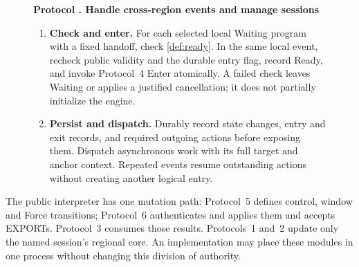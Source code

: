 \documentclass[11pt,a4paper]{article}
\newcounter{protocol}
\newenvironment{protocol}[3][htbp]{\begin{figure}[#1]\refstepcounter{protocol}\label{#2}
\begin{mdframed}[linewidth=.6pt,skipabove=0pt,skipbelow=0pt,
innertopmargin=7pt,innerbottommargin=7pt]\small
\textbf{Protocol \theprotocol. #3}\par\smallskip}{\end{mdframed}\end{figure}}
\begin{document}
\begin{protocol}[H]{alg:rotation}{Handle cross-region events and manage sessions}
\begin{enumerate}[label=\textbf{\arabic*)},itemsep=3pt]
source engines under the original Completion rule.
\item \textbf{Check and enter.} For each selected local Waiting
program with a fixed handoff, check \cref{def:ready}. In the same local
event, recheck public validity and the durable entry flag, record Ready,
and invoke Protocol~4 Enter atomically. A failed check leaves Waiting
or applies a justified cancellation; it does not partially initialize
the engine.
\item \textbf{Persist and dispatch.} Durably record state changes,
entry and exit records, and required outgoing actions before exposing
them. Dispatch asynchronous work with its full target and anchor
context. Repeated events resume outstanding actions without creating
another logical entry.
\end{enumerate}
\end{protocol}

The public interpreter has one mutation path: Protocol~5 defines
control, window and Force transitions; Protocol~6 authenticates and
applies them and accepts EXPORTs. Protocol~3 consumes those results.
Protocols~1 and~2 update only the named session's regional core.
An implementation may place these modules in one process without
changing this division of authority.
\end{document}
